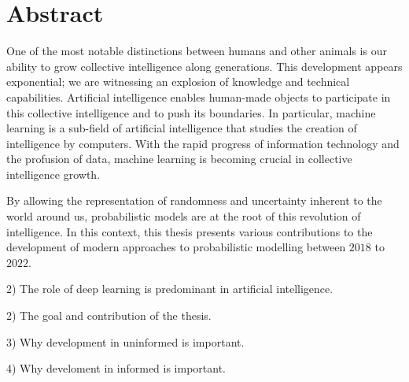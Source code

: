 
\chapter*{Abstract}
One of the most notable distinctions between humans and other animals is our ability to grow collective intelligence along generations. This development appears exponential; we are witnessing an explosion of knowledge and technical capabilities. Artificial intelligence enables human-made objects to participate in this collective intelligence and to push its boundaries. In particular, machine learning is a sub-field of artificial intelligence that studies the creation of intelligence by computers. With the rapid progress of information technology and the profusion of data, machine learning is becoming crucial in collective intelligence growth.

By allowing the representation of randomness and uncertainty inherent to the world around us, probabilistic models are at the root of this revolution of intelligence. In this context, this thesis presents various contributions to the development of modern approaches to probabilistic modelling between $2018$ to $2022$. 

2) The role of deep learning is predominant in artificial intelligence.

2) The goal and contribution of the thesis.

3) Why development in uninformed is important.

4) Why develoment in informed is important.
